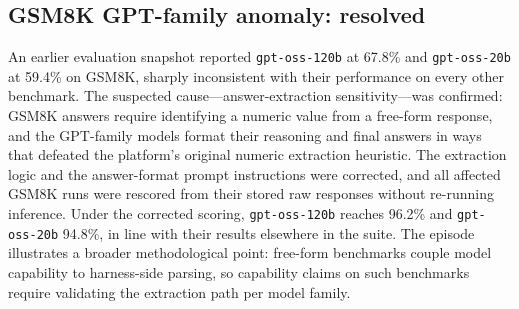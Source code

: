 \subsection{GSM8K GPT-family anomaly: resolved}
An earlier evaluation snapshot reported \texttt{gpt-oss-120b} at 67.8\% and \texttt{gpt-oss-20b} at 59.4\% on GSM8K, sharply inconsistent with their performance on every other benchmark. The suspected cause---answer-extraction sensitivity---was confirmed: GSM8K answers require identifying a numeric value from a free-form response, and the GPT-family models format their reasoning and final answers in ways that defeated the platform's original numeric extraction heuristic. The extraction logic and the answer-format prompt instructions were corrected, and all affected GSM8K runs were rescored from their stored raw responses without re-running inference. Under the corrected scoring, \texttt{gpt-oss-120b} reaches 96.2\% and \texttt{gpt-oss-20b} 94.8\%, in line with their results elsewhere in the suite. The episode illustrates a broader methodological point: free-form benchmarks couple model capability to harness-side parsing, so capability claims on such benchmarks require validating the extraction path per model family.

